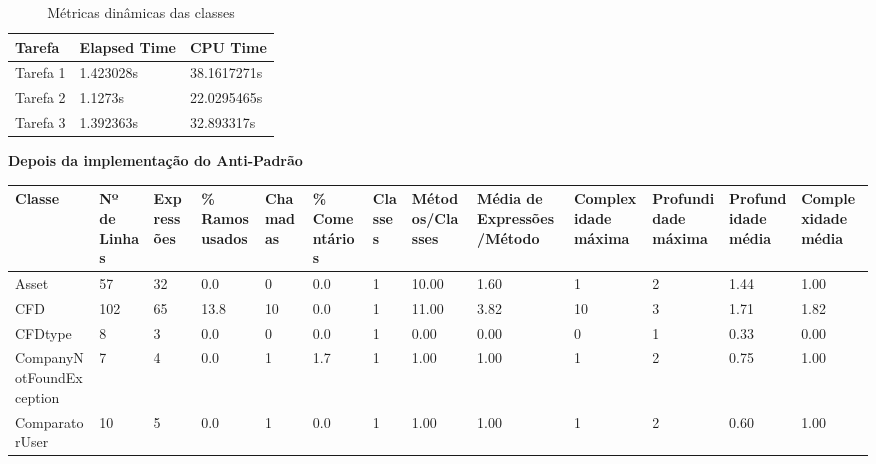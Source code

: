 \begin{table}[]
\centering
\begin{tabular}{|l|l|l|}
\hline
Tarefa   & Elapsed Time & CPU Time    \\ \hline
Tarefa 1 & 1.423028s    & 38.1617271s \\ \hline
Tarefa 2 & 1.1273s    & 22.0295465s \\ \hline
Tarefa 3 & 1.392363s    & 32.893317s \\ \hline
\end{tabular}
\caption{Métricas dinâmicas das classes}
\end{table}
\newpage
\textbf{Depois da implementação do Anti-Padrão}

\begin{table}[ht]
\centering
\begin{adjustbox}{width=1\textwidth}
\small
\begin{tabular}{|l|l|l|l|l|l|l|l|l|l|l|l|l|}
\hline
Classe                       & Nº de Linhas & Expressões & \% Ramos usados & Chamadas & \% Comentários & Classes & Métodos/Classes & Média de Expressões/Método & Complexidade máxima & Profundidade máxima & Profundidade média & Complexidade média \\ \hline
Asset                        & 57           & 32         & 0.0             & 0        & 0.0            & 1       & 10.00           & 1.60                       & 1                   & 2                   & 1.44               & 1.00               \\ \hline
CFD                          & 102          & 65         & 13.8            & 10       & 0.0            & 1       & 11.00           & 3.82                       & 10                  & 3                   & 1.71               & 1.82               \\ \hline
CFDtype                      & 8            & 3          & 0.0             & 0        & 0.0            & 1       & 0.00            & 0.00                       & 0                   & 1                   & 0.33               & 0.00               \\ \hline
CompanyNotFoundException     & 7            & 4          & 0.0             & 1        & 1.7            & 1       & 1.00            & 1.00                       & 1                   & 2                   & 0.75               & 1.00               \\ \hline
ComparatorUser               & 10           & 5          & 0.0             & 1        & 0.0            & 1       & 1.00            & 1.00                       & 1                   & 2                   & 0.60               & 1.00               \\ \hline

\end{tabular}
\end{adjustbox}
\end{table}
